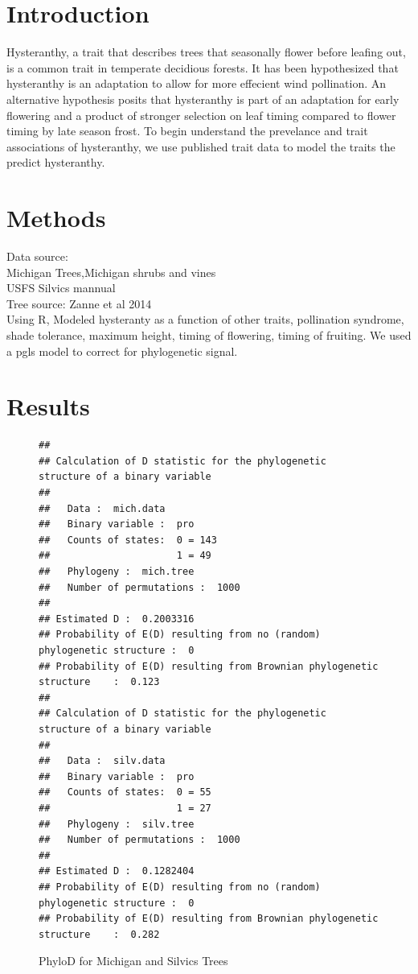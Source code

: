 \documentclass{article}\usepackage[]{graphicx}\usepackage[]{color}
\makeatletter
\newenvironment{kframe}{%
 \def\at@end@of@kframe{}%
 \ifinner\ifhmode%
  \def\at@end@of@kframe{\end{minipage}}%
  \begin{minipage}{\columnwidth}%
 \fi\fi%
 \def\FrameCommand##1{\hskip\@totalleftmargin \hskip-\fboxsep
 \colorbox{shadecolor}{##1}\hskip-\fboxsep
     \hskip-\linewidth \hskip-\@totalleftmargin \hskip\columnwidth}%
 \MakeFramed {\advance\hsize-\width
   \@totalleftmargin\z@ \linewidth\hsize
   \@setminipage}}%
 {\par\unskip\endMakeFramed%
 \at@end@of@kframe}
\newenvironment{knitrout}{}{} %
\makeatother
\begin{document}
\section*{Introduction}
Hysteranthy, a trait that describes trees that seasonally flower before leafing out, is a common trait in temperate decidious forests. It has been hypothesized that hysteranthy is an adaptation to allow for more effecient wind pollination. An alternative hypothesis posits that hysteranthy is part of an adaptation for early flowering and a product of stronger selection on leaf timing compared to flower timing by late season frost. To begin understand the prevelance and trait associations of hysteranthy, we use published trait data to model the traits the predict hysteranthy.

\section*{Methods}
Data source:\\ Michigan Trees,Michigan shrubs and vines\\ USFS Silvics mannual\\
Tree source: Zanne et al 2014\\
Using R, Modeled hysteranty as a function of other traits, pollination syndrome, shade tolerance, maximum height, timing of flowering, timing of fruiting. We used a pgls model to correct for phylogenetic signal.

\section*{Results}
\begin{figure}[h!]
\begin{knitrout}
\color{fgcolor}\begin{kframe}
\begin{verbatim}
## 
## Calculation of D statistic for the phylogenetic structure of a binary variable
## 
##   Data :  mich.data
##   Binary variable :  pro
##   Counts of states:  0 = 143
##                      1 = 49
##   Phylogeny :  mich.tree
##   Number of permutations :  1000
## 
## Estimated D :  0.2003316
## Probability of E(D) resulting from no (random) phylogenetic structure :  0
## Probability of E(D) resulting from Brownian phylogenetic structure    :  0.123
## 
## Calculation of D statistic for the phylogenetic structure of a binary variable
## 
##   Data :  silv.data
##   Binary variable :  pro
##   Counts of states:  0 = 55
##                      1 = 27
##   Phylogeny :  silv.tree
##   Number of permutations :  1000
## 
## Estimated D :  0.1282404
## Probability of E(D) resulting from no (random) phylogenetic structure :  0
## Probability of E(D) resulting from Brownian phylogenetic structure    :  0.282
\end{verbatim}
\end{kframe}
\end{knitrout}
\caption{PhyloD for Michigan and Silvics Trees}
\end{figure}
\end{document}
